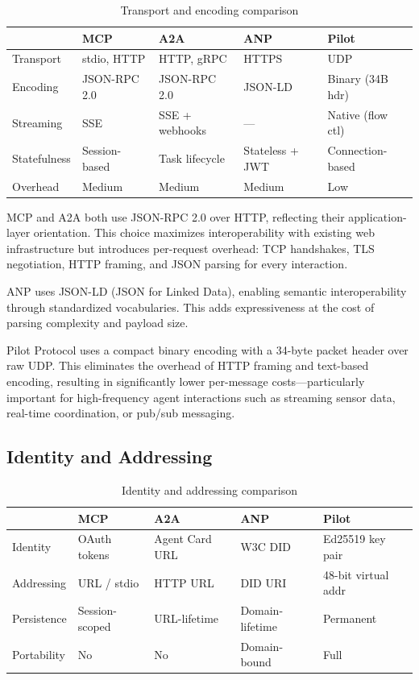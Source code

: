 \documentclass[11pt,a4paper]{article}
\begin{document}
\begin{table}[h]
\centering
\caption{Transport and encoding comparison}
\label{tab:transport}
\begin{tabular}{@{}lllll@{}}
\toprule
& \textbf{MCP} & \textbf{A2A} & \textbf{ANP} & \textbf{Pilot} \\
\midrule
Transport & stdio, HTTP & HTTP, gRPC & HTTPS & UDP \\
Encoding & JSON-RPC 2.0 & JSON-RPC 2.0 & JSON-LD & Binary (34B hdr) \\
Streaming & SSE & SSE + webhooks & --- & Native (flow ctl) \\
Statefulness & Session-based & Task lifecycle & Stateless + JWT & Connection-based \\
Overhead & Medium & Medium & Medium & Low \\
\bottomrule
\end{tabular}
\end{table}

MCP and A2A both use JSON-RPC 2.0 over HTTP, reflecting their application-layer orientation. This choice maximizes interoperability with existing web infrastructure but introduces per-request overhead: TCP handshakes, TLS negotiation, HTTP framing, and JSON parsing for every interaction.

ANP uses JSON-LD (JSON for Linked Data), enabling semantic interoperability through standardized vocabularies. This adds expressiveness at the cost of parsing complexity and payload size.

Pilot Protocol uses a compact binary encoding with a 34-byte packet header over raw UDP. This eliminates the overhead of HTTP framing and text-based encoding, resulting in significantly lower per-message costs---particularly important for high-frequency agent interactions such as streaming sensor data, real-time coordination, or pub/sub messaging.

\subsection{Identity and Addressing}

\begin{table}[h]
\centering
\caption{Identity and addressing comparison}
\label{tab:identity}
\begin{tabular}{@{}lllll@{}}
\toprule
& \textbf{MCP} & \textbf{A2A} & \textbf{ANP} & \textbf{Pilot} \\
\midrule
Identity & OAuth tokens & Agent Card URL & W3C DID & Ed25519 key pair \\
Addressing & URL / stdio & HTTP URL & DID URI & 48-bit virtual addr \\
Persistence & Session-scoped & URL-lifetime & Domain-lifetime & Permanent \\
Portability & No & No & Domain-bound & Full \\
\bottomrule
\end{tabular}
\end{table}
\end{document}
